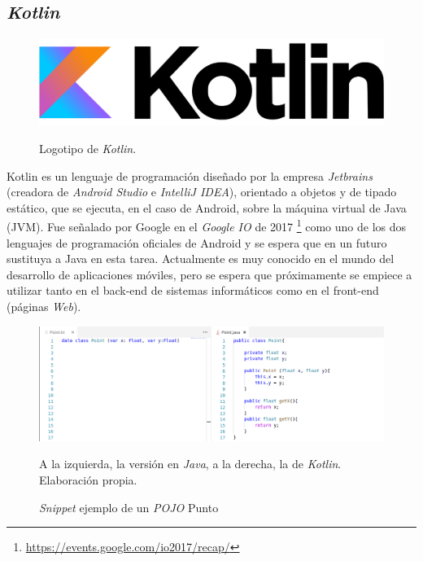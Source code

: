 \documentclass[twoside]{report}
\begin{document}
\subsection{\textit{Kotlin}}

\begin{figure}[H]
\centering
\includegraphics[scale=0.3]{images/kotlin}\\
\caption{Logotipo de \textit{Kotlin}.} \cite{kotlin}
\end{figure}

Kotlin\cite{smovkotlin} es un lenguaje de programación diseñado por la empresa \textit{Jetbrains} (creadora de \textit{Android Studio} e \textit{IntelliJ IDEA}), orientado a objetos y de tipado estático, que se ejecuta, en el caso de Android, sobre la máquina virtual de Java (JVM). Fue señalado por Google en el \textit{Google IO} de 2017 \footnote{\url{https://events.google.com/io2017/recap/}} como uno de los dos lenguajes de programación oficiales de Android y se espera que en un futuro sustituya a Java en esta tarea. Actualmente es muy conocido en el mundo del desarrollo de aplicaciones móviles, pero se espera que próximamente se empiece a utilizar tanto en el back-end de sistemas informáticos como en el front-end (páginas \textit{Web}).


\begin{figure}[H]
\centering
\includegraphics[width=\textwidth]{images/kotlinexample}\\
\caption{\textit{Snippet} ejemplo de un \textit{POJO} Punto} A la izquierda, la versión en \textit{Java}, a la derecha, la de \textit{Kotlin}. Elaboración propia.
\end{figure}
\end{document}
